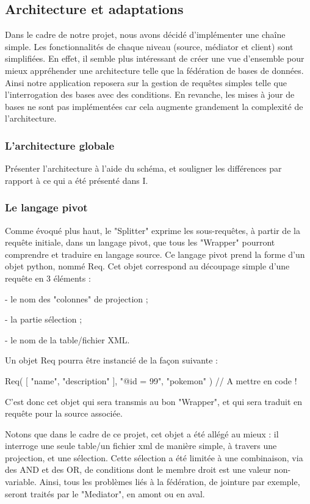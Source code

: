 \subsection{Architecture et adaptations}

Dans le cadre de notre projet, nous avons décidé d'implémenter une chaîne simple. Les fonctionnalités de chaque niveau (source, médiator et client) sont simplifiées. En effet, il semble plus intéressant de créer une vue d'ensemble pour mieux appréhender une architecture telle que la fédération de bases de données. Ainsi notre application reposera sur la gestion de requêtes simples telle que l'interrogation des bases avec des conditions. En revanche, les mises à jour de bases ne sont pas implémentées car cela augmente grandement la complexité de l'architecture.

\subsubsection{L'architecture globale}


Présenter l'architecture à l'aide du schéma, et souligner les différences par rapport à ce qui a été présenté dans I.

\subsubsection{Le langage pivot}

Comme évoqué plus haut, le "Splitter" exprime les sous-requêtes, à partir de la requête initiale, dans un langage pivot, que tous les "Wrapper" pourront comprendre et traduire en langage source. Ce langage pivot prend la forme d'un objet python, nommé Req. Cet objet correspond au découpage simple d'une requête en 3 éléments :

    - le nom des "colonnes" de projection ;

    - la partie sélection ;

    - le nom de la table/fichier XML.


Un objet Req pourra être instancié de la façon suivante :

Req( [ "name", "description" ], "@id = 99", "pokemon" ) // A mettre en code !

C'est donc cet objet qui sera transmis au bon "Wrapper", et qui sera traduit en requête pour la source associée.

Notons que dans le cadre de ce projet, cet objet a été allégé au mieux : il interroge une seule table/un fichier xml de manière simple, à travers une projection, et une sélection. Cette sélection a été limitée à une combinaison, via des AND et des OR, de conditions dont le membre droit est une valeur non-variable. Ainsi, tous les problèmes liés à la fédération, de jointure par exemple, seront traités par le "Mediator", en amont ou en aval.


